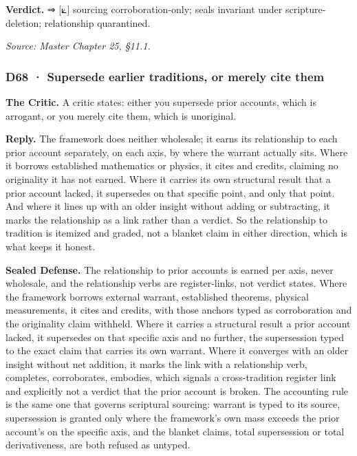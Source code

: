 \documentclass[10pt,twocolumn]{article}
\begin{document}
\textbf{Verdict.} ⇒ {[}⟀{]} sourcing corroboration-only; seals invariant
under scripture-deletion; relationship quarantined.

\emph{Source: Master Chapter 25, §11.1.}

\hypertarget{d68-supersede-earlier-traditions-or-merely-cite-them}{%
\subsubsection{D68 · Supersede earlier traditions, or merely cite
them}\label{d68-supersede-earlier-traditions-or-merely-cite-them}}

\textbf{The Critic.} A critic states: either you supersede prior
accounts, which is arrogant, or you merely cite them, which is
unoriginal.

\textbf{Reply.} The framework does neither wholesale; it earns its
relationship to each prior account separately, on each axis, by where
the warrant actually sits. Where it borrows established mathematics or
physics, it cites and credits, claiming no originality it has not
earned. Where it carries its own structural result that a prior account
lacked, it supersedes on that specific point, and only that point. And
where it lines up with an older insight without adding or subtracting,
it marks the relationship as a link rather than a verdict. So the
relationship to tradition is itemized and graded, not a blanket claim in
either direction, which is what keeps it honest.

\textbf{Sealed Defense.} The relationship to prior accounts is earned
per axis, never wholesale, and the relationship verbs are
register-links, not verdict states. Where the framework borrows external
warrant, established theorems, physical measurements, it cites and
credits, with those anchors typed as corroboration and the originality
claim withheld. Where it carries a structural result a prior account
lacked, it supersedes on that specific axis and no further, the
supersession typed to the exact claim that carries its own warrant.
Where it converges with an older insight without net addition, it marks
the link with a relationship verb, completes, corroborates, embodies,
which signals a cross-tradition register link and explicitly not a
verdict that the prior account is broken. The accounting rule is the
same one that governs scriptural sourcing: warrant is typed to its
source, supersession is granted only where the framework's own mass
exceeds the prior account's on the specific axis, and the blanket
claims, total supersession or total derivativeness, are both refused as
untyped.
\end{document}
